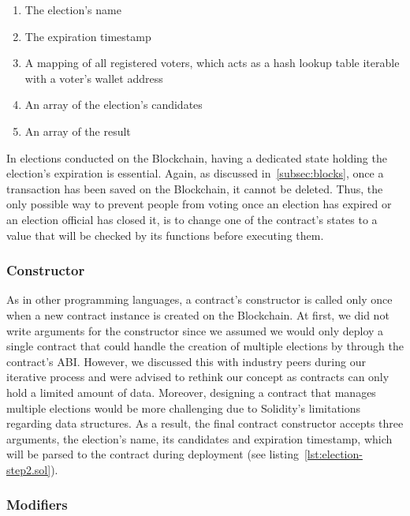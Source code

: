 \begin{enumerate}
    \item The election's name
    \item The expiration timestamp
    \item A mapping of all registered voters, which acts as a hash lookup table iterable with a voter's wallet address~\autocite[137]{antonopoulos_mastering_2019}
    \item An array of the election's candidates
    \item An array of the result
\end{enumerate}

In elections conducted on the \gls{Blockchain}, having a dedicated state holding the election's expiration is essential.
Again, as discussed in~\cref{subsec:blocks}, once a transaction has been saved on the \gls{Blockchain}, it cannot be deleted.
Thus, the only possible way to prevent people from voting once an election has expired or an election official has closed it, is to change one of the contract's states to a value that will be checked by its functions before executing them.

\subsubsection{Constructor}

As in other programming languages, a contract's constructor is called only once when a new contract instance is created on the \gls{Blockchain}.
At first, we did not write arguments for the constructor since we assumed we would only deploy a single contract that could handle the creation of multiple elections by  through the contract's \gls{ABI}.
However, we discussed this with industry peers during our iterative process and were advised to rethink our concept as contracts can only hold a limited amount of data.
Moreover, designing a contract that manages multiple elections would be more challenging due to Solidity's limitations regarding data structures.
As a result, the final contract constructor accepts three arguments, the election's name, its candidates and expiration timestamp, which will be parsed to the contract during deployment (see listing~\ref{lst:election-step2.sol}).

\subsubsection{Modifiers}

